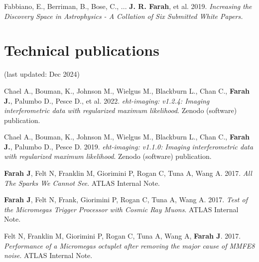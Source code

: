 \documentclass[margin,line]{res}
\begin{document}
\begin{resume}
Fabbiano, E., Berriman, B., Bose, C., ... \textbf{J. R. Farah}, et al. 2019. \textit{Increasing the Discovery Space in Astrophysics - A Collation of Six Submitted White Papers.} 


\vspace{+.4cm}
\section{\sc Technical publications}
(last updated: Dec 2024)

Chael A., Bouman, K., Johnson  M., Wielgus M., Blackburn L., Chan C., \textbf{Farah J.}, Palumbo D., Pesce D., et al. 2022. \textit{eht-imaging: v1.2.4: Imaging interferometric data with regularized maximum likelihood}. Zenodo (software) publication.

Chael A., Bouman, K., Johnson  M., Wielgus M., Blackburn L., Chan C., \textbf{Farah J.}, Palumbo D., Pesce D. 2019. \textit{eht-imaging: v1.1.0: Imaging interferometric data with regularized maximum likelihood}. Zenodo (software) publication.

\textbf{Farah J}, Felt N, Franklin M, Giorimini P, Rogan C, Tuna A, Wang A. 2017. \textit{All The Sparks We Cannot See}. ATLAS Internal Note.

\textbf{Farah J}, Felt N, Frank, Giorimini P, Rogan C, Tuna A, Wang A. 2017. \textit{Test of the Micromegas Trigger Processor with Cosmic Ray Muons}. ATLAS Internal Note.

Felt N, Franklin M, Giorimini P, Rogan C, Tuna A, Wang A, \textbf{Farah J}. 2017. \textit{Performance of a Micromegas octuplet after removing the major cause of MMFE8 noise}. ATLAS Internal Note.

\vspace{+.4cm}

\end{resume}
\end{document}

